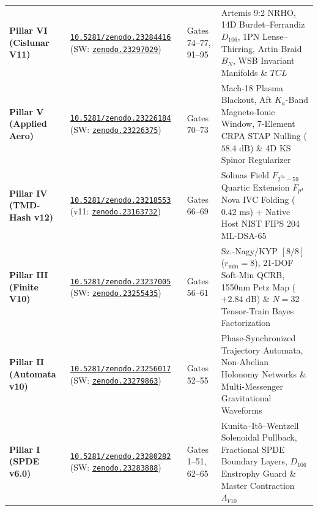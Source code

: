 \documentclass[11pt,a4paper,reqno]{article}
\def\texttt#1{#1}%
\def\mathrm#1{#1}%
\def\mathcal#1{#1}%
\def\mathbb#1{#1}%
\newcommand{\zenodo}[1]{\href{https://doi.org/10.5281/zenodo.#1}{\nolinkurl{10.5281/zenodo.#1}}}
\newcommand{\zenodoshort}[1]{\href{https://doi.org/10.5281/zenodo.#1}{\nolinkurl{zenodo.#1}}}
\theoremstyle{plain}
\theoremstyle{definition}
\theoremstyle{remark}
\numberwithin{equation}{section}
\begin{document}
\begin{center}
\begin{tabularx}{\textwidth}{@{}p{2.8cm}p{3.5cm}p{2.2cm}Y@{}}
\textbf{Pillar VI (Cislunar V11)} & \zenodo{23284416} (SW: \zenodoshort{23297029}) & \texttt{Gates 74--77, 91--95} & Artemis 9:2 NRHO, 14D Burdet--Ferrandiz $\mathbb{D}_{106}$, 1PN Lense--Thirring, Artin Braid $\mathcal{B}_N$, WSB Invariant Manifolds \& $\mathrm{TCL}$ \\
\textbf{Pillar V (Applied Aero)} & \zenodo{23226184} (SW: \zenodoshort{23226375}) & \texttt{Gates 70--73} & Mach-18 Plasma Blackout, Aft $K_a$-Band Magneto-Ionic Window, 7-Element CRPA STAP Nulling ($58.4\text{ dB}$) \& 4D KS Spinor Regularizer \\
\textbf{Pillar IV (TMD-Hash v12)} & \zenodo{23218553} (v11: \zenodoshort{23163732}) & \texttt{Gates 66--69} & Solinas Field $\mathbb{F}_{2^{64}-59}$ Quartic Extension $\mathbb{F}_{p^4}$ Nova IVC Folding ($0.42\text{ ms}$) + Native Host NIST FIPS 204 ML-DSA-65 \\
\textbf{Pillar III (Finite V10)} & \zenodo{23237005} (SW: \zenodoshort{23255435}) & \texttt{Gates 56--61} & Sz.-Nagy/KYP $[8/8]$ ($r_{\min}=8$), 21-DOF Soft-Min QCRB, 1550nm Petz Map ($+2.84\text{ dB}$) \& $N=32$ Tensor-Train Bayes Factorization \\
\textbf{Pillar II (Automata v10)} & \zenodo{23256017} (SW: \zenodoshort{23279863}) & \texttt{Gates 52--55} & Phase-Synchronized Trajectory Automata, Non-Abelian Holonomy Networks \& Multi-Messenger Gravitational Waveforms \\
\textbf{Pillar I (SPDE v6.0)} & \zenodo{23280282} (SW: \zenodoshort{23283888}) & \texttt{Gates 1--51, 62--65} & Kunita--It\^{o}--Wentzell Solenoidal Pullback, Fractional SPDE Boundary Layers, $\mathbb{D}_{106}$ Enstrophy Guard \& Master Contraction $\Lambda_{\mathrm{V10}}$ \\
\bottomrule
\end{tabularx}
\end{center}
\vspace{0.4em}
\end{document}
